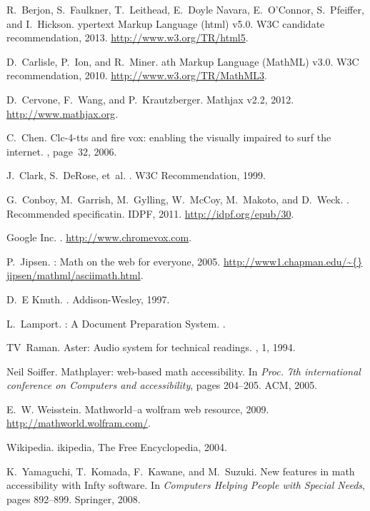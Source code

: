 \documentclass{sig-alternate}
\begin{document}
%  
\begin{thebibliography}{10}

R.~Berjon, S.~Faulkner, T.~Leithead, E.~Doyle Navara, E.~O'Connor, S.~Pfeiffer, and I.~Hickson.
ypertext {M}arkup {L}anguage (html) v5.0.
\newblock W3C candidate recommendation, 2013.
\newblock \url{http://www.w3.org/TR/html5}.

D.~Carlisle, P.~Ion, and R.~Miner.
ath {M}arkup {L}anguage ({MathML}) v3.0. 
\newblock W3C recommendation, 2010. 
\newblock \url{http://www.w3.org/TR/MathML3}.

D.~Cervone, F.~Wang, and P.~Krautzberger.
\newblock Mathjax v2.2, 2012.
\newblock \url{http://www.mathjax.org}.

C.~Chen.
\newblock Clc-4-tts and fire vox: enabling the visually impaired to surf the
  internet.
, page~32, 2006.

J.~Clark, S.~DeRose, et~al.
.
\newblock W3C Recommendation,  1999.

G.~Conboy, M.~Garrish, M.~Gylling, W.~McCoy, M.~Makoto, and
  D.~Weck.
.
\newblock Recommended specificatin. IDPF, 2011.
\newblock \url{http://idpf.org/epub/30}.

{Google} Inc.
.
\newblock \url{http://www.chromevox.com}.

P.~Jipsen.
: Math on the web for everyone, 2005.
\newblock \url{http://www1.chapman.edu/\~{}
  jipsen/mathml/asciimath.html}.

D.~E Knuth.
.
\newblock Addison-Wesley, 1997.

L.~Lamport.
\newblock {\LaTeX}: A Document Preparation System.
.

TV~Raman.
\newblock Aster: Audio system for technical readings.
, 1, 1994.

Neil Soiffer.
\newblock Mathplayer: web-based math accessibility.
\newblock In {\em Proc. 7th international conference
  on Computers and accessibility}, pages 204--205. ACM, 2005.

E.~W. Weisstein.
\newblock Mathworld--a wolfram web resource, 2009.
\newblock \url{http://mathworld.wolfram.com/}.

Wikipedia.
ikipedia{,} {The Free Encyclopedia}, 2004.

K.~Yamaguchi, T.~Komada, F.~Kawane, and M.~Suzuki.
\newblock New features in math accessibility with Infty software.
\newblock In {\em Computers Helping People with Special Needs}, pages 892--899.
  Springer, 2008.

\end{thebibliography}
\end{document}
